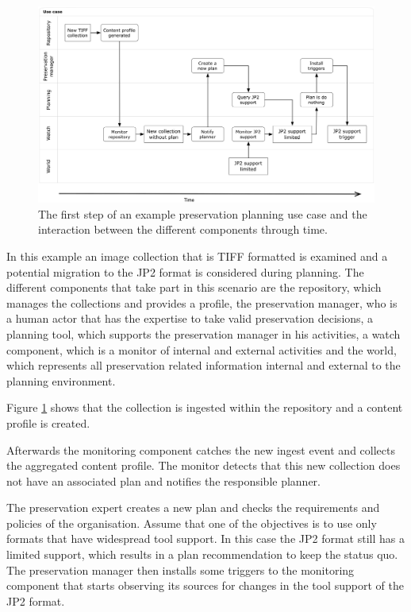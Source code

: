 \begin{figure}[th]
\begin{center}
\includegraphics[width=6in]{figures/related/swimlane_step1.png}
\caption{The first step of an example preservation planning use case and the interaction between the different components through time.}
\label{fig:swimlane_step1}
\end{center}
\end{figure}

In this example an image collection that is TIFF formatted is examined and a potential migration to the JP2 format is considered during planning. The different components that take part in this scenario are the repository, which manages the collections and provides a profile, the preservation manager, who is a human actor that has the expertise to take valid preservation decisions, a planning tool, which supports the preservation manager in his activities, a watch component, which is a monitor of internal and external activities and the world, which represents all preservation related information internal and external to the planning environment.

Figure \ref{fig:swimlane_step1} shows that the collection is ingested within the repository and a content profile is created.

Afterwards the monitoring component catches the new ingest event and collects the aggregated content profile. The monitor detects that this new collection does not have an associated plan and notifies the responsible planner.

The preservation expert creates a new plan and checks the requirements and policies of the organisation. Assume that one of the objectives is to use only formats that have widespread tool support. In this case the JP2 format still has a limited support, which results in a plan recommendation to keep the status quo. The preservation manager then installs some triggers to the monitoring component that starts observing its sources for changes in the tool support of the JP2 format.

